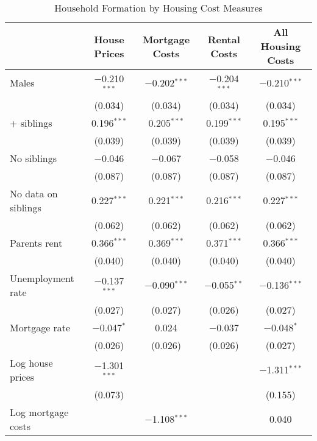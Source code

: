 
\begin{table}[!htbp] \centering 
  \begin{threeparttable}
  \caption{Household Formation by Housing Cost Measures} 
  \label{HC_Table} 
\begin{tabular}{@{\extracolsep{1pt}}lcccc} 
\toprule
\parbox[t]{0.24\textwidth}{\centering } & \parbox[t]{0.16\textwidth}{\centering House Prices} & \parbox[t]{0.16\textwidth}{\centering Mortgage Costs} & \parbox[t]{0.16\textwidth}{\centering Rental Costs} & \parbox[t]{0.16\textwidth}{\centering All Housing Costs} \\
\midrule
 Males & $-$0.210$^{***}$ & $-$0.202$^{***}$ & $-$0.204$^{***}$ & $-$0.210$^{***}$ \\ 
  & (0.034) & (0.034) & (0.034) & (0.034) \\ 
+ siblings & 0.196$^{***}$ & 0.205$^{***}$ & 0.199$^{***}$ & 0.195$^{***}$ \\ 
  & (0.039) & (0.039) & (0.039) & (0.039) \\ 
\addlinespace[0.5em]
 No siblings & $-$0.046 & $-$0.067 & $-$0.058 & $-$0.046 \\ 
  & (0.087) & (0.087) & (0.087) & (0.087) \\ 
\addlinespace[0.5em]
 No data on siblings & 0.227$^{***}$ & 0.221$^{***}$ & 0.216$^{***}$ & 0.227$^{***}$ \\ 
  & (0.062) & (0.062) & (0.062) & (0.062) \\ 
\addlinespace[0.5em]
 Parents rent & 0.366$^{***}$ & 0.369$^{***}$ & 0.371$^{***}$ & 0.366$^{***}$ \\ 
  & (0.040) & (0.040) & (0.040) & (0.040) \\ 
\addlinespace[0.5em]
 Unemployment rate & $-$0.137$^{***}$ & $-$0.090$^{***}$ & $-$0.055$^{**}$ & $-$0.136$^{***}$ \\ 
  & (0.027) & (0.027) & (0.026) & (0.027) \\ 
\addlinespace[0.5em]
 Mortgage rate & $-$0.047$^{*}$ & 0.024 & $-$0.037 & $-$0.048$^{*}$ \\ 
  & (0.026) & (0.026) & (0.026) & (0.027) \\ 
\addlinespace[0.5em]
 Log house prices & $-$1.301$^{***}$ &  &  & $-$1.311$^{***}$ \\ 
  & (0.073) &  &  & (0.155) \\ 
\addlinespace[0.5em]
 Log mortgage costs &  & $-$1.108$^{***}$ &  & 0.040 \\ 

\end{tabular}
\end{threeparttable}
\end{table}
